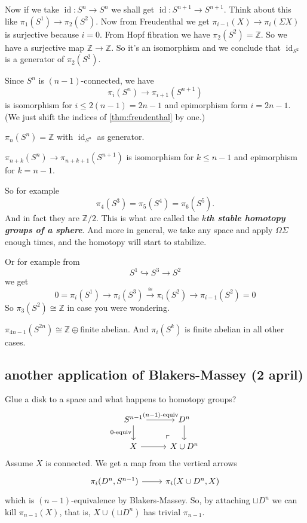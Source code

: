 \documentclass{article}
\newcommand{\Z}{\mathbb{Z}}
\DeclareMathOperator{\id}{id}
\begin{document}
Now if we take $\id:S^n\to S^n$ we shall get $\id:S^{n+1}\to S^{n+1}$. Think about this like $\pi_1(S^1)\to\pi_2(S^2)$. Now from Freudenthal we get $\pi_{i-1}(X)\to\pi_i(\Sigma X)$ is surjective because $i=0$. From Hopf fibration we have $\pi_2(S^2)=\Z$. So we have a surjective map $\Z\to\Z$. So it's an isomorphism and we conclude that $\id_{S^2}$ is a generator of $\pi_2(S^2)$.

\begin{coro}
	Since $S^n$ is $(n-1)$-connected, we have
	\[\pi_i(S^n)\to\pi_{i+1}(S^{n+1})\]
	is isomorphism for $i\leq 2(n-1)=2n-1$ and epimorphism form $i=2n-1$. (We just shift the indices of \cref{thm:freudenthal} by one.)
\end{coro}
\begin{coro}
	$\pi_n(S^n)=\Z$ with $\id_{S^n}$ as generator.
\end{coro}
\begin{coro}
	$\pi_{n+k}(S^n)\to\pi_{n+k+1}(S^{n+1})$ is isomorphism for $k\leq n-1$ and epimorphism for $k=n-1$.
\end{coro}
So for example
\[\pi_4(S^3)=\pi_5(S^4)=\pi_6(S^5).\]
And in fact they are $\Z/2$. This is what are called the \textbf{\textit{$k$th stable homotopy groups of a sphere}}. And more in general, we take any space and apply $\Omega\Sigma$ enough times, and the homotopy will start to stabilize.

Or for example from
\[S^1\hookrightarrow S^3\to S^2\]
we get
\[0=\pi_i(S^1)\to \pi_i(S^3)\overset{\cong}{\to}\pi_i(S^2)\to\pi_{i-1}(S^2)=0\]
So $\pi_3(S^2)\cong\Z$ in case you were wondering.
\begin{claim}[Serre]
	$\pi_{4n-1}(S^{2n})\cong\Z\oplus$finite abelian. And $\pi_i(S^k)$ is finite abelian in all other cases.
\end{claim}

\subsection{another application of Blakers-Massey (2 april)}
Glue a disk to a space and what happens to homotopy groups?
\[\begin{tikzcd}
	S^{n-1}\arrow[r,"(n-1)\text{-equiv}"]\arrow[d,"0\text{-equiv}",swap]&D^n\arrow[d]\\
	X\arrow[r]&X\cup D^n\arrow[ul, phantom, "\ulcorner", very near start]
\end{tikzcd}\]
Assume $X$ is connected. We get a map from the vertical arrows
\[\begin{tikzcd}
	\pi_i(D^n,S^{n-1})\arrow[r]&\pi_i(X\cup D^n,X)
\end{tikzcd}\]
which is $(n-1)$-equivalence by Blakers-Massey. So, by attaching $\sqcup D^n$ we can kill $\pi_{n-1}(X)$, that is, $X\cup(\sqcup D^n)$ has trivial $\pi_{n-1}$.
\end{document}
